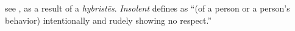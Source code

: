 \item[Insolent,]

see , as a result of a \emph{hybristēs}. \emph{Insolent} defines as ``(of a person or a person’s behavior) intentionally and rudely showing no respect.''
